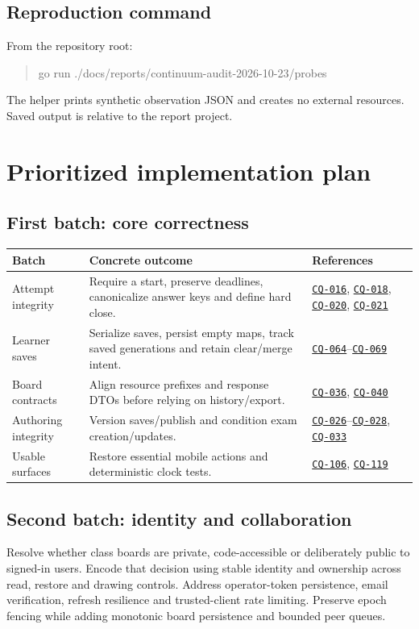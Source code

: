 \documentclass[11pt,a4paper]{article}
\DeclareRobustCommand{\issue}[1]{\hyperlink{#1}{\texttt{#1}}}
\newcommand{\src}[1]{{\small\path{#1}}}
\begin{document}
\subsection{Reproduction command}
From the repository root:
\begin{quote}\small\ttfamily go run ./docs/reports/continuum-audit-2026-10-23/probes\end{quote}
The helper prints synthetic observation JSON and creates no external resources. Saved output is \src{evidence/focused-probes.json} relative to the report project.
\clearpage

\section{Prioritized implementation plan}
\subsection{First batch: core correctness}
\begin{tabularx}{\textwidth}{@{}P{25mm}Xp{38mm}@{}}\toprule Batch & Concrete outcome & References \\\midrule
Attempt integrity & Require a start, preserve deadlines, canonicalize answer keys and define hard close. & \issue{CQ-016}, \issue{CQ-018}, \issue{CQ-020}, \issue{CQ-021} \\
Learner saves & Serialize saves, persist empty maps, track saved generations and retain clear/merge intent. & \issue{CQ-064}--\issue{CQ-069} \\
Board contracts & Align resource prefixes and response DTOs before relying on history/export. & \issue{CQ-036}, \issue{CQ-040} \\
Authoring integrity & Version saves/publish and condition exam creation/updates. & \issue{CQ-026}--\issue{CQ-028}, \issue{CQ-033} \\
Usable surfaces & Restore essential mobile actions and deterministic clock tests. & \issue{CQ-106}, \issue{CQ-119} \\\bottomrule\end{tabularx}
\subsection{Second batch: identity and collaboration}
Resolve whether class boards are private, code-accessible or deliberately public to signed-in users. Encode that decision using stable identity and ownership across read, restore and drawing controls. Address operator-token persistence, email verification, refresh resilience and trusted-client rate limiting. Preserve epoch fencing while adding monotonic board persistence and bounded peer queues.
\end{document}
